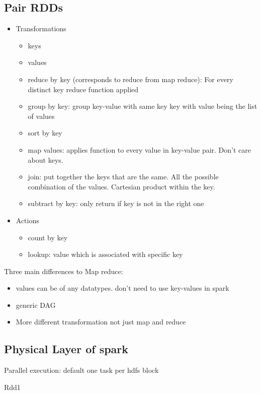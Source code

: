 \subsection{Pair RDDs}
\begin{itemize}
    \item Transformations
    \begin{itemize}
        \item keys
        \item values
        \item reduce by key (corresponds to reduce from map reduce): For every distinct key reduce function applied
        \item group by key: group key-value with same key \textrightarrow key with value being the list of values
        \item sort by key
        \item map values: applies function to every value in key-value pair. Don't care about keys.
        \item join: put together the keys that are the same.
        All the possible combination of the values. Cartesian product within the key.
        \item subtract by key: only return if key is not in the right one
    \end{itemize}
    \item Actions
    \begin{itemize}
        \item count by key
        \item lookup: value which is associated with specific key
    \end{itemize}
\end{itemize}

Three main differences to Map reduce:
\begin{itemize}
    \item values can be of any datatypes. don't need to use key-values in spark
    \item generic DAG
    \item More different transformation not just map and reduce
\end{itemize}


\subsection{Physical Layer of spark}
Parallel execution: default one task per hdfs block

Rdd1 \textrightarrow

